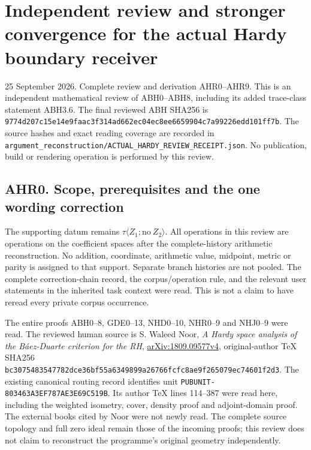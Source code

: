 \section{Independent review and stronger convergence for the actual
Hardy boundary
receiver}\label{independent-review-and-stronger-convergence-for-the-actual-hardy-boundary-receiver}

25 September 2026. Complete review and derivation AHR0--AHR9. This is an
independent mathematical review of ABH0--ABH8, including its added
trace-class statement ABH3.6. The final reviewed ABH SHA256 is
\nolinkurl{9774d207c15e14e9faac3f314ad662ec04ec8ee6659904c7a99226edd101ff7b}.
The source hashes and exact reading coverage are recorded in
\nolinkurl{argument_reconstruction/ACTUAL_HARDY_REVIEW_RECEIPT.json}. No
publication, build or rendering operation is performed by this review.

\subsection{AHR0. Scope, prerequisites and the one wording
correction}\label{ahr0.-scope-prerequisites-and-the-one-wording-correction}

The supporting datum remains
\(\tau\langle Z_1;\mathrm{no}\ Z_2\rangle\). All operations in this
review are operations on the coefficient spaces after the
complete-history arithmetic reconstruction. No addition, coordinate,
arithmetic value, midpoint, metric or parity is assigned to that
support. Separate branch histories are not pooled. The complete
correction-chain record, the corpus/operation rule, and the relevant
user statements in the inherited task context were read. This is not a
claim to have reread every private corpus occurrence.

The entire proofs ABH0--8, GDE0--13, NHD0--10, NHR0--9 and NHJ0--9 were
read. The reviewed human source is S. Waleed Noor, \emph{A Hardy space
analysis of the Báez-Duarte criterion for the RH},
\href{https://arxiv.org/abs/1809.09577v4}{arXiv:1809.09577v4},
original-author TeX SHA256
\nolinkurl{bc3075483547782dce36bf55a6349899a26766fcfc8ae9f265079ec74601f2d3}.
The existing canonical routing record identifies unit
\nolinkurl{PUBUNIT-803463A3EF787AE3E69C519B}. Its author TeX lines
114--387 were read here, including the weighted isometry, cover, density
proof and adjoint-domain proof. The external books cited by Noor were
not newly read. The complete source topology and full zero ideal remain
those of the incoming proofs; this review does not claim to reconstruct
the programme's original geometry independently.

